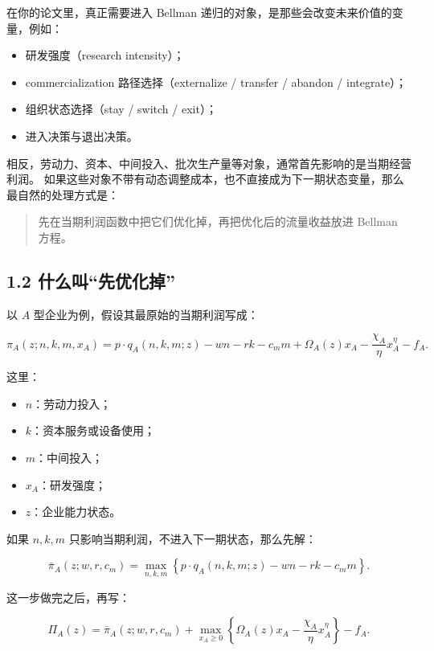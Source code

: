 \documentclass[12pt,fontset=none]{ctexart}
\begin{document}
在你的论文里，真正需要进入 Bellman 递归的对象，是那些会改变未来价值的变量，例如：

\begin{itemize}[leftmargin=2em]
    \item 研发强度（research intensity）；
    \item commercialization 路径选择（externalize / transfer / abandon / integrate）；
    \item 组织状态选择（stay / switch / exit）；
    \item 进入决策与退出决策。
\end{itemize}

相反，劳动力、资本、中间投入、批次生产量等对象，通常首先影响的是当期经营利润。
如果这些对象不带有动态调整成本，也不直接成为下一期状态变量，那么最自然的处理方式是：

\begin{quote}
先在当期利润函数中把它们优化掉，再把优化后的流量收益放进 Bellman 方程。
\end{quote}

\subsection{1.2 什么叫“先优化掉”}

以 \(A\) 型企业为例，假设其最原始的当期利润写成：

\[
\pi_A(z;n,k,m,x_A)
=
p\cdot q_A(n,k,m;z)
-wn-rk-c_m m
+\Omega_A(z)x_A
-\frac{\chi_A}{\eta}x_A^\eta
-f_A.
\]

这里：

\begin{itemize}[leftmargin=2em]
    \item \(n\)：劳动力投入；
    \item \(k\)：资本服务或设备使用；
    \item \(m\)：中间投入；
    \item \(x_A\)：研发强度；
    \item \(z\)：企业能力状态。
\end{itemize}

如果 \(n,k,m\) 只影响当期利润，不进入下一期状态，那么先解：

\[
\bar{\pi}_A(z;w,r,c_m)
=
\max_{n,k,m}
\left\{
p\cdot q_A(n,k,m;z)-wn-rk-c_m m
\right\}.
\]

这一步做完之后，再写：

\[
\Pi_A(z)
=
\bar{\pi}_A(z;w,r,c_m)
+
\max_{x_A\ge 0}
\left\{
\Omega_A(z)x_A-\frac{\chi_A}{\eta}x_A^\eta
\right\}
-f_A.
\]
\end{document}
